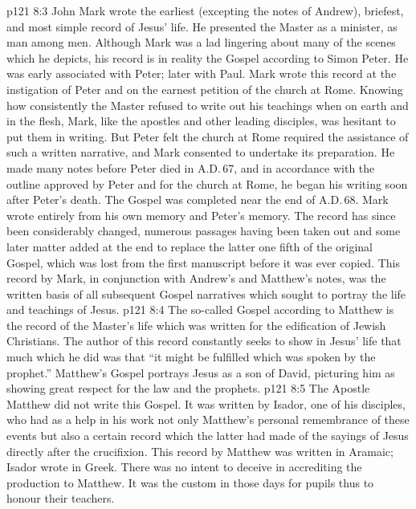 \vs p121 8:3 \bibnobreakspace {} John Mark wrote the earliest (excepting the notes of Andrew), briefest, and most simple record of Jesus’ life. He presented the Master as a minister, as man among men. Although Mark was a lad lingering about many of the scenes which he depicts, his record is in reality the Gospel according to Simon Peter. He was early associated with Peter; later with Paul. Mark wrote this record at the instigation of Peter and on the earnest petition of the church at Rome. Knowing how consistently the Master refused to write out his teachings when on earth and in the flesh, Mark, like the apostles and other leading disciples, was hesitant to put them in writing. But Peter felt the church at Rome required the assistance of such a written narrative, and Mark consented to undertake its preparation. He made many notes before Peter died in A.D.\,67, and in accordance with the outline approved by Peter and for the church at Rome, he began his writing soon after Peter’s death. The Gospel was completed near the end of A.D.\,68. Mark wrote entirely from his own memory and Peter’s memory. The record has since been considerably changed, numerous passages having been taken out and some later matter added at the end to replace the latter one fifth of the original Gospel, which was lost from the first manuscript before it was ever copied. This record by Mark, in conjunction with Andrew’s and Matthew’s notes, was the written basis of all subsequent Gospel narratives which sought to portray the life and teachings of Jesus.
\vs p121 8:4 \bibnobreakspace {} The so\hyp{}called Gospel according to Matthew is the record of the Master’s life which was written for the edification of Jewish Christians. The author of this record constantly seeks to show in Jesus’ life that much which he did was that “it might be fulfilled which was spoken by the prophet.” Matthew’s Gospel portrays Jesus as a son of David, picturing him as showing great respect for the law and the prophets.
\vs p121 8:5 The Apostle Matthew did not write this Gospel. It was written by Isador, one of his disciples, who had as a help in his work not only Matthew’s personal remembrance of these events but also a certain record which the latter had made of the sayings of Jesus directly after the crucifixion. This record by Matthew was written in Aramaic; Isador wrote in Greek. There was no intent to deceive in accrediting the production to Matthew. It was the custom in those days for pupils thus to honour their teachers.
